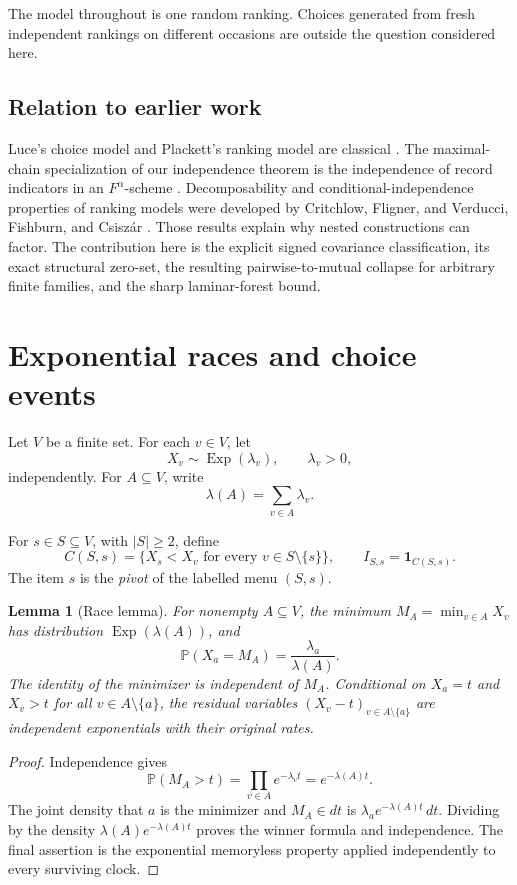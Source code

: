 \documentclass[11pt]{article}
\newtheorem{lemma}[theorem]{Lemma}
\theoremstyle{definition}
\newcommand{\Pp}{\mathbb{P}}
\newcommand{\1}{\mathbf{1}}
\newcommand{\Exp}{\operatorname{Exp}}
\begin{document}
The model throughout is one random ranking. Choices generated from fresh independent rankings on
different occasions are outside the question considered here.

\subsection*{Relation to earlier work}

Luce's choice model and Plackett's ranking model are classical
\cite{Luce1959,Plackett1975}. The maximal-chain specialization of our independence theorem is the
independence of record indicators in an \(F^\alpha\)-scheme
\cite{BorovkovPfeifer1995}. Decomposability and conditional-independence properties of ranking
models were developed by Critchlow, Fligner, and Verducci, Fishburn, and Csisz\'ar
\cite{CritchlowFlignerVerducci1991,Fishburn1994,Csiszar2009}. Those results explain why nested
constructions can factor. The contribution here is the explicit signed covariance classification,
its exact structural zero-set, the resulting pairwise-to-mutual collapse for arbitrary finite
families, and the sharp laminar-forest bound.

\section{Exponential races and choice events}

Let \(V\) be a finite set. For each \(v\in V\), let
\[
X_v\sim\Exp(\lambda_v),\qquad \lambda_v>0,
\]
independently. For \(A\subseteq V\), write
\[
\lambda(A)=\sum_{v\in A}\lambda_v.
\]

For \(s\in S\subseteq V\), with \(|S|\geq2\), define
\[
C(S,s)=\{X_s<X_v\text{ for every }v\in S\setminus\{s\}\},
\qquad I_{S,s}=\1_{C(S,s)}.
\]
The item \(s\) is the \emph{pivot} of the labelled menu \((S,s)\).

\begin{lemma}[Race lemma]
\label{lem:race}
For nonempty \(A\subseteq V\), the minimum \(M_A=\min_{v\in A}X_v\) has distribution
\(\Exp(\lambda(A))\), and
\[
\Pp(X_a=M_A)=\frac{\lambda_a}{\lambda(A)}.
\]
The identity of the minimizer is independent of \(M_A\). Conditional on \(X_a=t\) and
\(X_v>t\) for all \(v\in A\setminus\{a\}\), the residual variables
\((X_v-t)_{v\in A\setminus\{a\}}\) are independent exponentials with their original rates.
\end{lemma}

\begin{proof}
Independence gives
\[
\Pp(M_A>t)=\prod_{v\in A}e^{-\lambda_vt}=e^{-\lambda(A)t}.
\]
The joint density that \(a\) is the minimizer and \(M_A\in dt\) is
\(\lambda_a e^{-\lambda(A)t}\,dt\). Dividing by the density
\(\lambda(A)e^{-\lambda(A)t}\) proves the winner formula and independence. The final assertion is
the exponential memoryless property applied independently to every surviving clock.
\end{proof}
\end{document}
